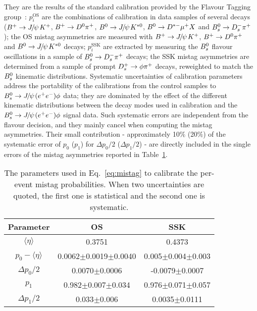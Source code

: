 They are the results of the standard calibration provided by the Flavour Tagging group~\cite{LHCb:FTa, LHCb:FTb}: $p^{\text{OS}}_{i}$ are the combinations of calibration in data samples of several decays (${{B}^+}\rightarrow{\ensuremath{{J\mskip -3mu/\mskip -2mu\psi\mskip 2mu}}}{\ensuremath{{K}^+}}$, ${{B}^+}\rightarrow{\ensuremath{{D}^0}}{\ensuremath{{\pi}^+}}$, ${{B}^0}\rightarrow{\ensuremath{{J\mskip -3mu/\mskip -2mu\psi\mskip 2mu}}}{\ensuremath{{K}^{*0}}}$, ${{B}^0}\rightarrow{\ensuremath{{D}^{*-}}}{\ensuremath{\mu^+}} X$ and ${{B}^0_{s}}\rightarrow{\ensuremath{{D}^-_{s}}}{\ensuremath{{\pi}^+}}$); the OS mistag asymmetries are measured with ${{B}^+}\rightarrow{\ensuremath{{J\mskip -3mu/\mskip -2mu\psi\mskip 2mu}}}{\ensuremath{{K}^+}}$, ${{B}^+}\rightarrow{\ensuremath{{D}^0}}{\ensuremath{{\pi}^+}}$ and ${{B}^0}\rightarrow{\ensuremath{{J\mskip -3mu/\mskip -2mu\psi\mskip 2mu}}}{\ensuremath{{K}^{*0}}}$ decays; $p^{\text{SSK}}_{i}$ are extracted by measuring the ${{B}^0_{s}}$ flavour oscillations in a sample of ${{B}^0_{s}}\rightarrow{\ensuremath{{D}^-_{s}}}{\ensuremath{{\pi}^+}}$ decays; the SSK mistag asymmetries are determined from a sample of prompt ${{D}^+_{s}}\rightarrow\phi{\ensuremath{{\pi}^+}}$ decays, reweighted to match the ${{B}^0_{s}}$ kinematic distributions. Systematic uncertainties of calibration parameters address the portability of the calibrations from the control samples to ${{B}^0_{s}}\rightarrow{\ensuremath{{J\mskip -3mu/\mskip -2mu\psi\mskip 2mu}}}({e^+e^-})\phi$ data; they are dominated by the effect of the different kinematic distributions between the decay modes used in calibration and the ${{B}^0_{s}}\rightarrow{\ensuremath{{J\mskip -3mu/\mskip -2mu\psi\mskip 2mu}}}({e^+e^-})\phi$ signal data. Such systematic errors are independent from the flavour decision, and they mainly cancel when computing the mistag asymmetries. Their small contribution - approximately 10$\%$ (20$\%$) of the systematic error of $p_{0}$ ($p_{1}$) for $\Delta p_{0}/2$ ($\Delta p_{1}/2$) - are directly included in the single errors of the mistag asymmetries reported in Table~\ref{tab:CalibrationFT}.

 \begin{table}[htb]
  \caption{
   The parameters used in Eq.~\ref{eq:mistag} to calibrate the per-event mistag probabilities. When two uncertainties are quoted, the first one is statistical and the second one is systematic.}
    \small{
\begin{center}\begin{tabular}{ccc}
    Parameter                         &  OS  & SSK  \\ 
    \hline
   $\langle\eta\rangle$& 0.3751&   0.4373 \\
    $p_{0}-\langle\eta\rangle$ &   0.0062$\pm$0.0019$\pm$0.0040 & 0.005$\pm$0.004$\pm$0.003 \\
    $\Delta p_{0}/2$& 0.0070$\pm$0.0006 &    -0.0079$\pm$0.0007 \\
    $p_{1}$ &   0.982$\pm$0.007$\pm$0.034 & 0.976$\pm$0.071$\pm$0.057 \\
    $\Delta p_{1}/2$& 0.033$\pm$0.006 &    0.0035$\pm$0.0111 \\
    \hline
  \end{tabular}\end{center}
  }
\label{tab:CalibrationFT}
\end{table}

